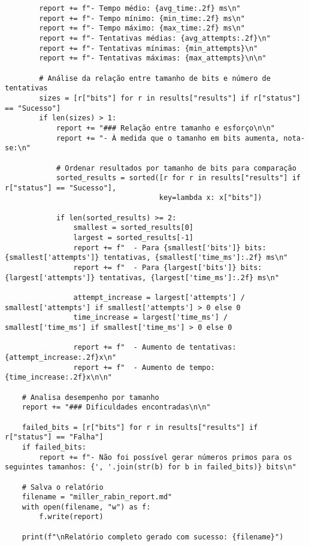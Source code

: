 \begin{verbatim}
        report += f"- Tempo médio: {avg_time:.2f} ms\n"
        report += f"- Tempo mínimo: {min_time:.2f} ms\n"
        report += f"- Tempo máximo: {max_time:.2f} ms\n"
        report += f"- Tentativas médias: {avg_attempts:.2f}\n"
        report += f"- Tentativas mínimas: {min_attempts}\n"
        report += f"- Tentativas máximas: {max_attempts}\n\n"
        
        # Análise da relação entre tamanho de bits e número de tentativas
        sizes = [r["bits"] for r in results["results"] if r["status"] == "Sucesso"]
        if len(sizes) > 1:
            report += "### Relação entre tamanho e esforço\n\n"
            report += "- À medida que o tamanho em bits aumenta, nota-se:\n"
            
            # Ordenar resultados por tamanho de bits para comparação
            sorted_results = sorted([r for r in results["results"] if r["status"] == "Sucesso"], 
                                    key=lambda x: x["bits"])
            
            if len(sorted_results) >= 2:
                smallest = sorted_results[0]
                largest = sorted_results[-1]
                report += f"  - Para {smallest['bits']} bits: {smallest['attempts']} tentativas, {smallest['time_ms']:.2f} ms\n"
                report += f"  - Para {largest['bits']} bits: {largest['attempts']} tentativas, {largest['time_ms']:.2f} ms\n"
                
                attempt_increase = largest['attempts'] / smallest['attempts'] if smallest['attempts'] > 0 else 0
                time_increase = largest['time_ms'] / smallest['time_ms'] if smallest['time_ms'] > 0 else 0
                
                report += f"  - Aumento de tentativas: {attempt_increase:.2f}x\n"
                report += f"  - Aumento de tempo: {time_increase:.2f}x\n\n"
    
    # Analisa desempenho por tamanho
    report += "### Dificuldades encontradas\n\n"
    
    failed_bits = [r["bits"] for r in results["results"] if r["status"] == "Falha"]
    if failed_bits:
        report += f"- Não foi possível gerar números primos para os seguintes tamanhos: {', '.join(str(b) for b in failed_bits)} bits\n"
    
    # Salva o relatório
    filename = "miller_rabin_report.md"
    with open(filename, "w") as f:
        f.write(report)
    
    print(f"\nRelatório completo gerado com sucesso: {filename}")
\end{verbatim}
